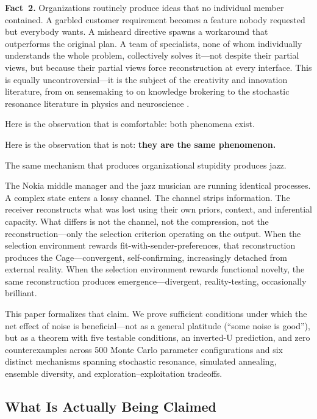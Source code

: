 \documentclass[12pt,letterpaper]{article}
\theoremstyle{definition}
\theoremstyle{remark}
\begin{document}
\textbf{Fact~2.} Organizations routinely produce ideas that no individual member contained. A garbled customer requirement becomes a feature nobody requested but everybody wants. A misheard directive spawns a workaround that outperforms the original plan. A team of specialists, none of whom individually understands the whole problem, collectively solves it---not despite their partial views, but because their partial views force reconstruction at every interface. This is equally uncontroversial---it is the subject of the creativity and innovation literature, from \citet{weick1979} on sensemaking to \citet{hargadon1997} on knowledge brokering to the stochastic resonance literature in physics \citep{gammaitoni1998} and neuroscience \citep{mcdonnell2009}.

Here is the observation that is comfortable: both phenomena exist.

Here is the observation that is not: \textbf{they are the same phenomenon.}

The same mechanism that produces organizational stupidity produces jazz.

The Nokia middle manager and the jazz musician are running identical processes. A complex state enters a lossy channel. The channel strips information. The receiver reconstructs what was lost using their own priors, context, and inferential capacity. What differs is not the channel, not the compression, not the reconstruction---only the selection criterion operating on the output. When the selection environment rewards fit-with-sender-preferences, that reconstruction produces the Cage---convergent, self-confirming, increasingly detached from external reality. When the selection environment rewards functional novelty, the same reconstruction produces emergence---divergent, reality-testing, occasionally brilliant.

This paper formalizes that claim. We prove sufficient conditions under which the net effect of noise is beneficial---not as a general platitude (``some noise is good''), but as a theorem with five testable conditions, an inverted-U prediction, and zero counterexamples across 500 Monte Carlo parameter configurations and six distinct mechanisms spanning stochastic resonance, simulated annealing, ensemble diversity, and exploration--exploitation tradeoffs.


\subsection{What Is Actually Being Claimed}
\end{document}
